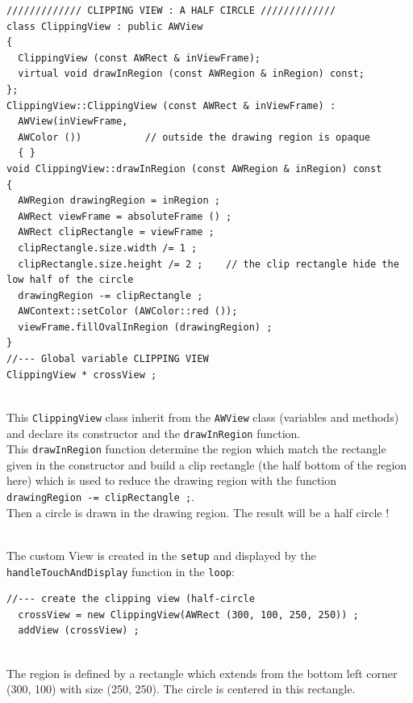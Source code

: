 \documentclass[a4paper,11pt]{extarticle}
\begin{document}
\begin{lstlisting}[language=Arduinonl]
///////////// CLIPPING VIEW : A HALF CIRCLE /////////////
class ClippingView : public AWView
{
  ClippingView (const AWRect & inViewFrame);
  virtual void drawInRegion (const AWRegion & inRegion) const;
};
ClippingView::ClippingView (const AWRect & inViewFrame) :
  AWView(inViewFrame, 
  AWColor ())           // outside the drawing region is opaque 
  { }
void ClippingView::drawInRegion (const AWRegion & inRegion) const
{
  AWRegion drawingRegion = inRegion ;
  AWRect viewFrame = absoluteFrame () ;
  AWRect clipRectangle = viewFrame ;
  clipRectangle.size.width /= 1 ;
  clipRectangle.size.height /= 2 ;    // the clip rectangle hide the low half of the circle
  drawingRegion -= clipRectangle ;
  AWContext::setColor (AWColor::red ());
  viewFrame.fillOvalInRegion (drawingRegion) ;
}
//--- Global variable CLIPPING VIEW
ClippingView * crossView ;
\end{lstlisting}

~\\ This \texttt{ClippingView} class inherit from the \texttt{AWView} class (variables and methods) and declare its constructor and the \texttt{drawInRegion} function.
~\\ This \texttt{drawInRegion} function determine the region which match the rectangle given in the constructor and build a clip rectangle (the half bottom of the region here) which is used to reduce the drawing region with the function \texttt{drawingRegion -= clipRectangle ;}.
~\\ Then a circle is drawn in the drawing region. The result will be a half circle !

~\\ The custom View is created in the \texttt{setup}  and displayed by the \texttt{handleTouchAndDisplay} function in the \texttt{loop}:
\begin{lstlisting}[language=Arduinonl]
//--- create the clipping view (half-circle
  crossView = new ClippingView(AWRect (300, 100, 250, 250)) ;
  addView (crossView) ;
\end{lstlisting}

~\\ The region is defined by a rectangle which extends from the bottom left corner (300, 100) with size (250, 250). The circle is centered in this rectangle.
\end{document}
